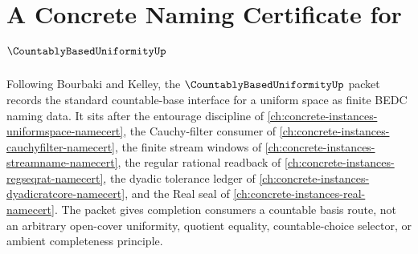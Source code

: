 \chapter{A Concrete Naming Certificate for $\CountablyBasedUniformityUp$}
\label{ch:concrete-instances-countably-based-uniformity-namecert}

Following Bourbaki and Kelley, the $\CountablyBasedUniformityUp$ packet records the standard countable-base interface for a uniform space as finite BEDC naming data. It sits after the entourage discipline of \autoref{ch:concrete-instances-uniformspace-namecert}, the Cauchy-filter consumer of \autoref{ch:concrete-instances-cauchyfilter-namecert}, the finite stream windows of \autoref{ch:concrete-instances-streamname-namecert}, the regular rational readback of \autoref{ch:concrete-instances-regseqrat-namecert}, the dyadic tolerance ledger of \autoref{ch:concrete-instances-dyadicratcore-namecert}, and the Real seal of \autoref{ch:concrete-instances-real-namecert}. The packet gives completion consumers a countable basis route, not an arbitrary open-cover uniformity, quotient equality, countable-choice selector, or ambient completeness principle.

